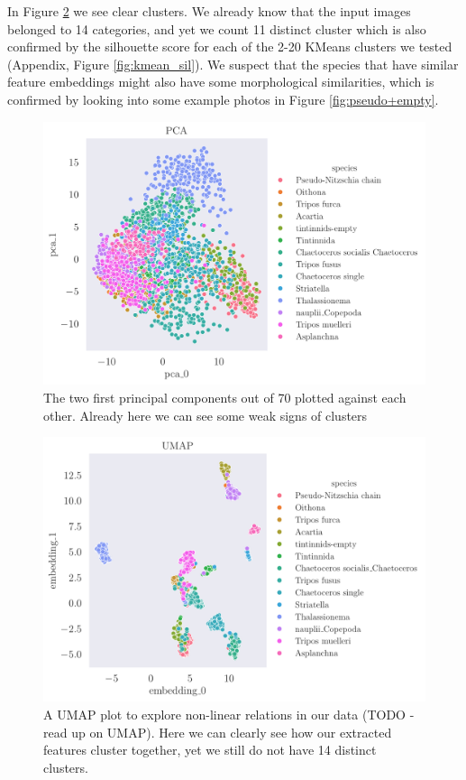 In Figure \ref{fig:umap} we see clear clusters. We already know that the input images belonged to 14 categories, and yet we count 11 distinct cluster which is also confirmed by the silhouette score for each of the 2-20 KMeans clusters we tested (Appendix, Figure \ref{fig:kmean_sil}). We suspect that the species that have similar feature embeddings might also have some morphological similarities, which is confirmed by looking into some example photos in Figure \ref{fig:pseudo+empty}. 

\begin{figure}[H]
    \centering
    \includegraphics[width=1.1\linewidth]{examples/tests_eb/figs/pca0_pca1.pdf}
    \caption{The two first principal components out of 70 plotted against each other. Already here we can see some weak signs of clusters}
    \label{fig:pca0pca1}
\end{figure}

\begin{figure}[H]
    \centering
    \includegraphics[width=1.1\linewidth]{examples/tests_eb/figs/umap.pdf}
    \caption{A UMAP plot to explore non-linear relations in our data (TODO - read up on UMAP). Here we can clearly see how our extracted features cluster together, yet we still do not have 14 distinct clusters.}
    \label{fig:umap}
\end{figure}

